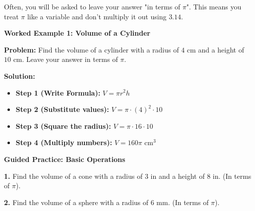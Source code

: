 \documentclass[12pt, letterpaper, fleqn]{article}
\begin{document}
\noindent
Often, you will be asked to leave your answer "in terms of $\pi$". This means you treat $\pi$ like a variable and don't multiply it out using $3.14$.

\vspace{3mm}

\begin{tcolorbox}[colback=white, colframe=black!25, boxrule=0.6pt, arc=4mm, left=6mm, right=6mm, top=5mm, bottom=5mm]

\textbf{Worked Example 1: Volume of a Cylinder}

\medskip

\textbf{Problem:} Find the volume of a cylinder with a radius of $4\text{ cm}$ and a height of $10\text{ cm}$. Leave your answer in terms of $\pi$.

\medskip

\textbf{Solution:}
\begin{itemize}
    \item \textbf{Step 1 (Write Formula):} $V = \pi r^2 h$
    \item \textbf{Step 2 (Substitute values):} $V = \pi \cdot (4)^2 \cdot 10$
    \item \textbf{Step 3 (Square the radius):} $V = \pi \cdot 16 \cdot 10$
    \item \textbf{Step 4 (Multiply numbers):} $V = 160\pi\text{ cm}^3$
\end{itemize}

\end{tcolorbox}

\vspace{4mm}

\begin{tcolorbox}[colback=white!15, colframe=black, boxrule=1.5pt, arc=4mm, left=6mm, right=6mm, top=5mm, bottom=5mm]

\textbf{Guided Practice: Basic Operations}

\medskip

\noindent
\textbf{1.} Find the volume of a cone with a radius of $3\text{ in}$ and a height of $8\text{ in}$. (In terms of $\pi$).
\vspace{2.5cm}

\noindent
\textbf{2.} Find the volume of a sphere with a radius of $6\text{ mm}$. (In terms of $\pi$).
\vspace{2.5cm}

\end{tcolorbox}
\end{document}
